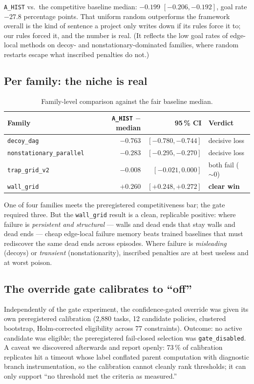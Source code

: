 \documentclass[11pt]{article}
\begin{document}
\texttt{A\_HIST} vs.\ the competitive baseline median: $-0.199$
$[-0.206, -0.192]$, goal rate $-27.8$ percentage points. That uniform random
outperforms the framework overall is the kind of sentence a project only
writes down if its rules force it to; our rules forced it, and the number is
real. (It reflects the low goal rates of edge-local methods on decoy- and
nonstationary-dominated families, where random restarts escape what
inscribed penalties do not.)

\subsection{Per family: the niche is real}\label{sec:perfamily}

\begin{table}[ht]
\centering
\begin{tabular}{lrrl}
\toprule
Family & \texttt{A\_HIST} $-$ median & 95\,\% CI & Verdict \\
\midrule
\texttt{decoy\_dag} & $-0.763$ & $[-0.780, -0.744]$ & decisive loss \\
\texttt{nonstationary\_parallel} & $-0.283$ & $[-0.295, -0.270]$ & decisive loss \\
\texttt{trap\_grid\_v2} & $-0.008$ & $[-0.021, 0.000]$ & both fail (${\sim}0$) \\
\texttt{wall\_grid} & $\mathbf{+0.260}$ & $[+0.248, +0.272]$ & \textbf{clear win} \\
\bottomrule
\end{tabular}
\caption{Family-level comparison against the fair baseline median.}
\label{tab:family}
\end{table}

One of four families meets the preregistered competitiveness bar; the gate
required three. But the \texttt{wall\_grid} result is a clean, replicable
positive: where failure is \emph{persistent and structural} --- walls and
dead ends that stay walls and dead ends --- cheap edge-local failure memory
beats trained baselines that must rediscover the same dead ends across
episodes. Where failure is \emph{misleading} (decoys) or \emph{transient}
(nonstationarity), inscribed penalties are at best useless and at worst
poison.

\subsection{The override gate calibrates to ``off''}\label{sec:gate}

Independently of the gate experiment, the confidence-gated override was
given its own preregistered calibration (2{,}880 tasks, 12 candidate
policies, clustered bootstrap, Holm-corrected eligibility across 77
constraints). Outcome: no active candidate was eligible; the preregistered
fail-closed selection was \texttt{gate\_disabled}. A caveat we discovered
afterwards and report openly: 73\,\% of calibration replicates hit a timeout
whose label conflated parent computation with diagnostic branch
instrumentation, so the calibration cannot cleanly rank thresholds; it can
only support ``no threshold met the criteria as measured.''
\end{document}
